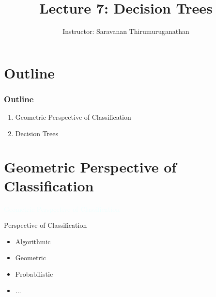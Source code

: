 \documentclass{beamer}
\title[Saravanan Thirumuruganathan] 
{Lecture 7: Decision Trees}
\author[CSE 5334] 
{Instructor: Saravanan Thirumuruganathan}
\date[]
\newcommand{\thblue}[1]{{\Huge {\textcolor{azure}{#1}}}}
\begin{document}
\begin{frame}
  \titlepage
\end{frame}


\section{Outline}

\begin{frame}
\frametitle {Outline}
\begin{enumerate}
\item Geometric Perspective of Classification
\item Decision Trees
\end{enumerate}
\end{frame}




\section{Geometric Perspective of Classification}
\begin{frame}{} 
    \begin{center}
        \thblue{Geometric Perspective of Classification}
    \end{center}
\end{frame}

\begin{frame}{Perspective of Classification}
    \begin{itemize}
        \item Algorithmic
        \item Geometric 
        \item Probabilistic
        \item $\ldots$
    \end{itemize}
\end{frame}
\end{document}
